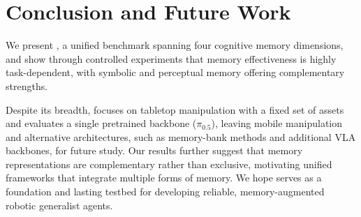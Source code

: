 \section{Conclusion and Future Work}
\label{sec:conclusion}

We present \benchname, a unified benchmark spanning four cognitive memory dimensions, and show through controlled experiments that memory effectiveness is highly task-dependent, with symbolic and perceptual memory offering complementary strengths.


Despite its breadth, \benchname\xspace focuses on tabletop manipulation with a fixed set of assets and evaluates a single pretrained backbone ($\pi_{0.5}$), leaving mobile manipulation and alternative architectures, such as memory-bank methods and additional VLA backbones, for future study. Our results further suggest that memory representations are complementary rather than exclusive, motivating unified frameworks that integrate multiple forms of memory. We hope \benchname\xspace serves as a foundation and lasting testbed for developing reliable, memory-augmented robotic generalist agents.

